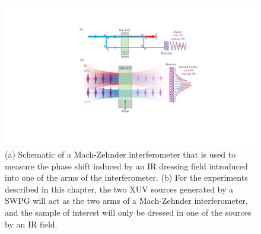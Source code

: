 \begin{figure}
	\centering
	\includegraphics[width=1.0\textwidth]{figures/CATS/CATS_mach_zehnder.pdf}
	\caption[Schematic of Mach-Zehnder interferometer and spatial profile with and without an IR dressing field in one arm of the interferometer]{(a) Schematic of a Mach-Zehnder interferometer that is used to measure the phase shift induced by an IR dressing field introduced into one of the arms of the interferometer. (b) For the experiments described in this chapter, the two XUV sources generated by a SWPG will act as the two arms of a Mach-Zehnder interferometer, and the sample of interest will only be dressed in one of the sources by an IR field.}
	\label{fig:CATS_mach-zehnder_interferometer}
\end{figure}

